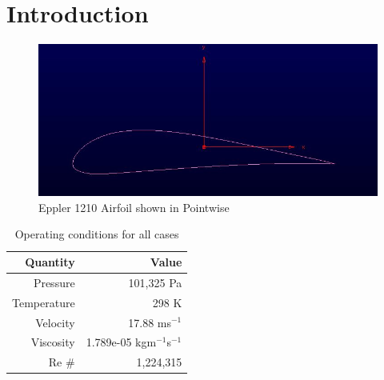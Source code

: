 \section{Introduction}


\begin{figure}[h!]
	\centering
	\includegraphics[width=\textwidth]{general_images/airfoil_image}
	\caption{Eppler 1210 Airfoil shown in Pointwise}
\label{fig:airfoil}
\end{figure}

\begin{table}[H]
\caption{Operating conditions for all cases}
	\centering
	\begin{tabular}{|r|r|} \hline
		Quantity & Value \\ \hline \hline
		Pressure & 101,325 Pa \\ \hline
		Temperature & 298 K  \\ \hline
		Velocity & 17.88 ms$^{-1}$ \\ \hline
		Viscosity & 1.789e-05 kgm$^{-1}$s$^{-1}$ \\ \hline
		Re \# & 1,224,315 \\ \hline
	\end{tabular}
\end{table}

